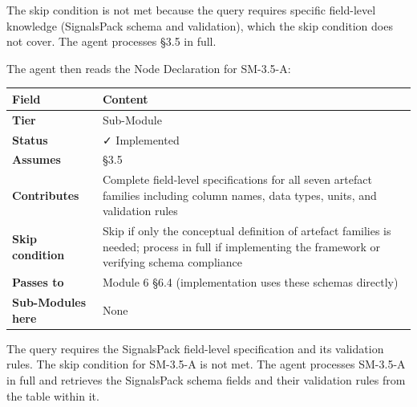 \documentclass[
  11pt,
  a4paper,
  twoside,
  openright]{scrbook}
\newcounter{none} %
\begin{document}
The skip condition is not met because the query requires specific
field-level knowledge (SignalsPack schema and validation), which the
skip condition does not cover. The agent processes §3.5 in full.

The agent then reads the Node Declaration for SM-3.5-A:

\begin{tcolorbox}[enhanced jigsaw, arc=.35mm, bottomrule=.15mm, bottomtitle=1mm, breakable, colback=white, colbacktitle=quarto-callout-note-color!10!white, colframe=quarto-callout-note-color-frame, coltitle=black, left=2mm, leftrule=.75mm, opacityback=0, opacitybacktitle=0.6, rightrule=.15mm, title={Node Declaration --- SM-3.5-A: Canonical Artefact Schema Reference}, titlerule=0mm, toprule=.15mm, toptitle=1mm]

{\def\LTcaptype{none} %
\begin{longtable}[]{@{}
  >{\raggedright\arraybackslash}p{}
  >{\raggedright\arraybackslash}p{}@{}}
\toprule\noalign{}
\begin{minipage}[b]{\linewidth}\raggedright
Field
\end{minipage} & \begin{minipage}[b]{\linewidth}\raggedright
Content
\end{minipage} \\
\midrule\noalign{}
\endhead
\bottomrule\noalign{}
\endlastfoot
\textbf{Tier} & Sub-Module \\
\textbf{Status} & ✓ Implemented \\
\textbf{Assumes} & §3.5 \\
\textbf{Contributes} & Complete field-level specifications for all seven
artefact families including column names, data types, units, and
validation rules \\
\textbf{Skip condition} & Skip if only the conceptual definition of
artefact families is needed; process in full if implementing the
framework or verifying schema compliance \\
\textbf{Passes to} & Module 6 §6.4 (implementation uses these schemas
directly) \\
\textbf{Sub-Modules here} & None \\
\end{longtable}
}

\end{tcolorbox}

The query requires the SignalsPack field-level specification and its
validation rules. The skip condition for SM-3.5-A is not met. The agent
processes SM-3.5-A in full and retrieves the SignalsPack schema fields
and their validation rules from the table within it.
\end{document}
